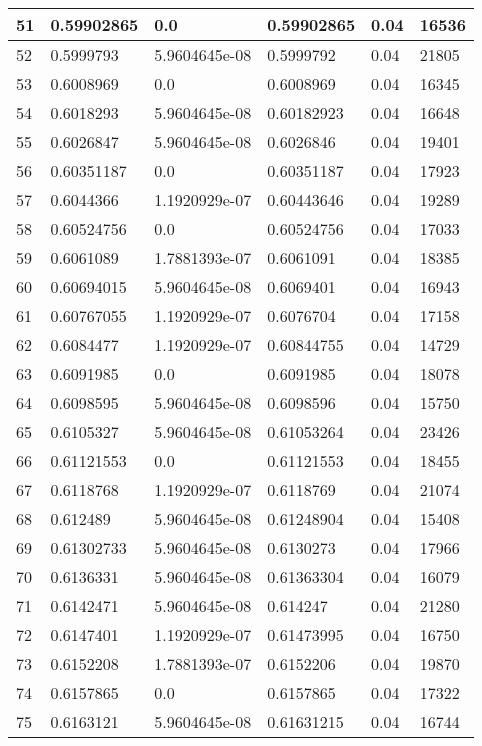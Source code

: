 \begin{longtable}{|l|l|l|l|l|l|}
51 & 0.59902865 & 0.0 & 0.59902865 & 0.04 & 16536 \\ \hline 
52 & 0.5999793 & 5.9604645e-08 & 0.5999792 & 0.04 & 21805 \\ \hline 
53 & 0.6008969 & 0.0 & 0.6008969 & 0.04 & 16345 \\ \hline 
54 & 0.6018293 & 5.9604645e-08 & 0.60182923 & 0.04 & 16648 \\ \hline 
55 & 0.6026847 & 5.9604645e-08 & 0.6026846 & 0.04 & 19401 \\ \hline 
56 & 0.60351187 & 0.0 & 0.60351187 & 0.04 & 17923 \\ \hline 
57 & 0.6044366 & 1.1920929e-07 & 0.60443646 & 0.04 & 19289 \\ \hline 
58 & 0.60524756 & 0.0 & 0.60524756 & 0.04 & 17033 \\ \hline 
59 & 0.6061089 & 1.7881393e-07 & 0.6061091 & 0.04 & 18385 \\ \hline 
60 & 0.60694015 & 5.9604645e-08 & 0.6069401 & 0.04 & 16943 \\ \hline 
61 & 0.60767055 & 1.1920929e-07 & 0.6076704 & 0.04 & 17158 \\ \hline 
62 & 0.6084477 & 1.1920929e-07 & 0.60844755 & 0.04 & 14729 \\ \hline 
63 & 0.6091985 & 0.0 & 0.6091985 & 0.04 & 18078 \\ \hline 
64 & 0.6098595 & 5.9604645e-08 & 0.6098596 & 0.04 & 15750 \\ \hline 
65 & 0.6105327 & 5.9604645e-08 & 0.61053264 & 0.04 & 23426 \\ \hline 
66 & 0.61121553 & 0.0 & 0.61121553 & 0.04 & 18455 \\ \hline 
67 & 0.6118768 & 1.1920929e-07 & 0.6118769 & 0.04 & 21074 \\ \hline 
68 & 0.612489 & 5.9604645e-08 & 0.61248904 & 0.04 & 15408 \\ \hline 
69 & 0.61302733 & 5.9604645e-08 & 0.6130273 & 0.04 & 17966 \\ \hline 
70 & 0.6136331 & 5.9604645e-08 & 0.61363304 & 0.04 & 16079 \\ \hline 
71 & 0.6142471 & 5.9604645e-08 & 0.614247 & 0.04 & 21280 \\ \hline 
72 & 0.6147401 & 1.1920929e-07 & 0.61473995 & 0.04 & 16750 \\ \hline 
73 & 0.6152208 & 1.7881393e-07 & 0.6152206 & 0.04 & 19870 \\ \hline 
74 & 0.6157865 & 0.0 & 0.6157865 & 0.04 & 17322 \\ \hline 
75 & 0.6163121 & 5.9604645e-08 & 0.61631215 & 0.04 & 16744 \\ \hline 
\end{longtable}